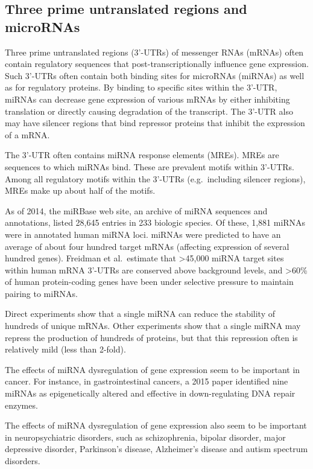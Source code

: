 \hypertarget{three-prime-untranslated-regions-and-micrornas}{%
\subsection{Three prime untranslated regions and microRNAs}\label{three-prime-untranslated-regions-and-micrornas}}

Three prime untranslated regions (3'-UTRs) of messenger RNAs (mRNAs) often contain regulatory sequences that post-transcriptionally influence gene expression. Such 3'-UTRs often contain both binding sites for microRNAs (miRNAs) as well as for regulatory proteins. By binding to specific sites within the 3'-UTR, miRNAs can decrease gene expression of various mRNAs by either inhibiting translation or directly causing degradation of the transcript. The 3'-UTR also may have silencer regions that bind repressor proteins that inhibit the expression of a mRNA.

The 3'-UTR often contains miRNA response elements (MREs). MREs are sequences to which miRNAs bind. These are prevalent motifs within 3'-UTRs. Among all regulatory motifs within the 3'-UTRs (e.g.~including silencer regions), MREs make up about half of the motifs.

As of 2014, the miRBase web site, an archive of miRNA sequences and annotations, listed 28,645 entries in 233 biologic species. Of these, 1,881 miRNAs were in annotated human miRNA loci. miRNAs were predicted to have an average of about four hundred target mRNAs (affecting expression of several hundred genes). Freidman et al.~estimate that \textgreater45,000 miRNA target sites within human mRNA 3'-UTRs are conserved above background levels, and \textgreater60\% of human protein-coding genes have been under selective pressure to maintain pairing to miRNAs.

Direct experiments show that a single miRNA can reduce the stability of hundreds of unique mRNAs. Other experiments show that a single miRNA may repress the production of hundreds of proteins, but that this repression often is relatively mild (less than 2-fold).

The effects of miRNA dysregulation of gene expression seem to be important in cancer. For instance, in gastrointestinal cancers, a 2015 paper identified nine miRNAs as epigenetically altered and effective in down-regulating DNA repair enzymes.

The effects of miRNA dysregulation of gene expression also seem to be important in neuropsychiatric disorders, such as schizophrenia, bipolar disorder, major depressive disorder, Parkinson's disease, Alzheimer's disease and autism spectrum disorders.

